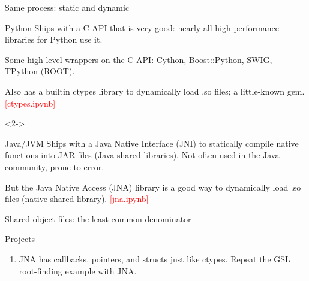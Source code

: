 \documentclass{beamer}
\begin{document}
\begin{frame}{Same process: static and dynamic}
\vspace{0.25 cm}
\begin{block}{Python}
Ships with a C API that is very good: nearly all high-performance libraries for Python use it.

\vspace{0.25 cm}
Some high-level wrappers on the C API: Cython, Boost::Python, SWIG, TPython (ROOT).

\vspace{0.25 cm}
Also has a builtin ctypes library to dynamically load .so files; a little-known gem. \hfill \textcolor{red}{[ctypes.ipynb]}
\end{block}

\begin{uncoverenv}<2->
\begin{block}{Java/JVM}
Ships with a Java Native Interface (JNI) to statically compile native functions into JAR files (Java shared libraries). Not often used in the Java community, prone to error.

\vspace{0.25 cm}
But the Java Native Access (JNA) library is a good way to dynamically load .so files (native shared library). \hfill \textcolor{red}{[jna.ipynb]}
\end{block}\end{uncoverenv}
\end{frame}

\begin{frame}{Shared object files: the least common denominator}





\end{frame}





\begin{frame}{Projects}
\begin{enumerate}
\item JNA has callbacks, pointers, and structs just like ctypes. Repeat the GSL root-finding example with JNA.


\end{enumerate}
\end{frame}
\end{document}

